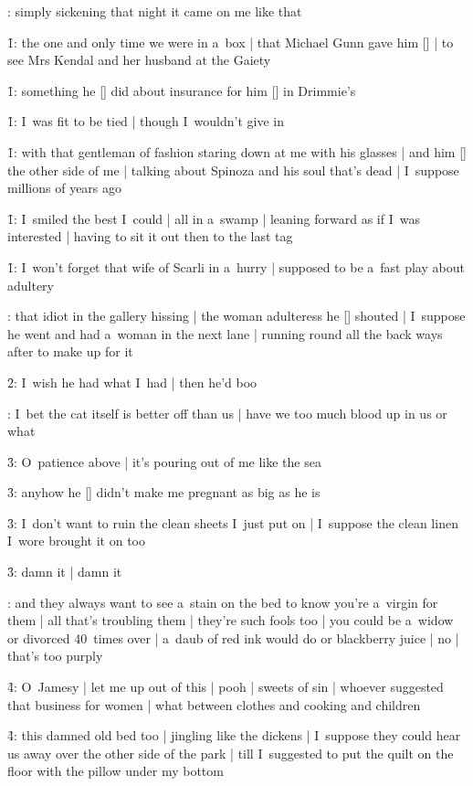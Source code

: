 :
simply sickening that night it came on me like that

\f1:
the one and only time we were in a~box |
that Michael Gunn gave him [\bloom] |
to see Mrs Kendal and her husband at the Gaiety

\f1:
something he [\bloom] did about insurance for him [\gunn] in Drimmie's

\f1:
I~was fit to be tied |
though I~wouldn't give in

\f1:
with that gentleman of fashion staring down at me with his glasses |
and him [\bloom] the other side of me |
talking about Spinoza and his soul that's dead |
I~suppose millions of years ago

\f1:
I~smiled the best I~could |
all in a~swamp |
leaning forward as if I~was interested |
having to sit it out then to the last tag

\f1:
I~won't forget that wife of Scarli in a~hurry |
supposed to be a~fast play about adultery

:
that idiot in the gallery hissing |
the woman adulteress he [\idiot] shouted |
I~suppose he went and had a~woman in the next lane |
running round all the back ways after to make up for it

\f2:
I~wish he had what I~had |
then he'd boo

:
I~bet the cat itself is better off than us |
have we too much blood up in us or what

\f3:
O~patience above |
it's pouring out of me like the sea

\f3:
anyhow he [\boylan] didn't make me pregnant as big as he is

\f3:
I~don't want to ruin the clean sheets I~just put on |
I~suppose the clean linen I~wore brought it on too

\f3:
damn it |
damn it

:
and they always want to see a~stain on the bed to know you're a~virgin for them |
all that's troubling them |
they're such fools too |
you could be a~widow or divorced 40~times over |
a~daub of red ink would do or blackberry juice |
no |
that's too purply

\f4:
O~Jamesy |
let me up out of this |
pooh |
sweets of sin |
whoever suggested that business for women |
what between clothes and cooking and children

\f4:
this damned old bed too |
jingling like the dickens |
I~suppose they could hear us away over the other side of the park |
till I~suggested to put the quilt on the floor with the pillow under my bottom

